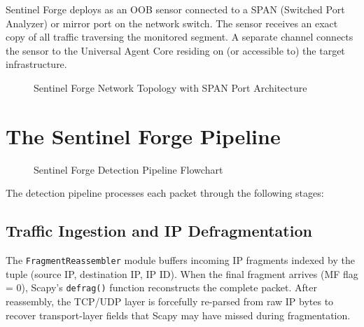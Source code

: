 Sentinel Forge deploys as an OOB sensor connected to a SPAN (Switched Port Analyzer) or mirror port on the network switch. The sensor receives an exact copy of all traffic traversing the monitored segment. A separate channel connects the sensor to the Universal Agent Core residing on (or accessible to) the target infrastructure.

\begin{figure}[h]
\centering
{}
\caption{Sentinel Forge Network Topology with SPAN Port Architecture}
\label{fig:network_topology}
\end{figure}

\section{The Sentinel Forge Pipeline}

\begin{figure}[h]
\centering
{}
\caption{Sentinel Forge Detection Pipeline Flowchart}
\label{fig:pipeline_flowchart}
\end{figure}

The detection pipeline processes each packet through the following stages:

\subsection{Traffic Ingestion and IP Defragmentation}

The \texttt{FragmentReassembler} module buffers incoming IP fragments indexed by the tuple (source IP, destination IP, IP ID). When the final fragment arrives (MF flag = 0), Scapy's \texttt{defrag()} function reconstructs the complete packet. After reassembly, the TCP/UDP layer is forcefully re-parsed from raw IP bytes to recover transport-layer fields that Scapy may have missed during fragmentation.

